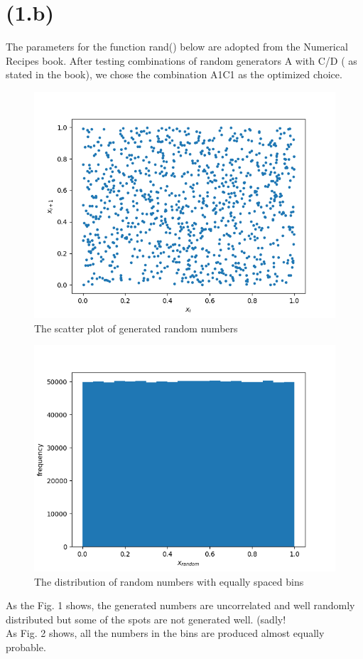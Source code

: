 \section{(1.b)}
The parameters for the function rand() below are adopted from the Numerical Recipes book. After testing combinations of random generators A with C/D ( as stated in the book), we chose the combination A1C1 as the optimized choice.
\begin{figure}[!htb]
  \centering
  \includegraphics[width=0.7\linewidth]{Plots/scatt_1b.png}
  \caption{The scatter plot of generated random numbers}
  \label{fig:fig1}
\end{figure}

\begin{figure}[!htb]
  \centering
  \includegraphics[width=0.7\linewidth]{Plots/hist_1b.png}
  \caption{The distribution of random numbers with equally spaced bins}
  \label{fig:fig2}
\end{figure}

As the Fig. 1 shows, the generated numbers are uncorrelated and well randomly distributed but some of the spots are not generated well. (sadly!\\
As Fig. 2 shows, all the numbers in the bins are produced almost equally probable.





